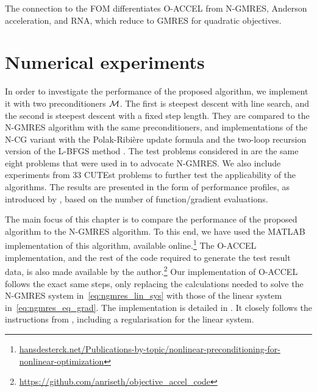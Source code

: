 \documentclass[main.tex]{subfiles}
\begin{document}
\begin{remark}
  The connection to the FOM differentiates O-ACCEL from N-GMRES,
  Anderson acceleration, and RNA, which reduce to GMRES for quadratic
  objectives.
\end{remark}


\section{Numerical experiments}\label{sec:num_experiments}
In order to investigate the performance of the proposed algorithm, we
implement it with two preconditioners $\mathcal{M}$. The first is steepest
descent with line search, and the second is steepest descent with a
fixed step length.  They are compared to the N-GMRES algorithm with
the same preconditioners, and implementations of the N-CG variant with
the Polak-Ribi\`{e}re update formula and the two-loop recursion version of the L-BFGS method
\citep{nocedal2006numerical}.  The test problems considered in
are the same eight problems that were used
in \citet{sterck2013steepest} to advocate N-GMRES. We also include
experiments from \num{33} CUTEst problems to further test the
applicability of the algorithms.  The results are presented in the
form of performance profiles, as introduced by
\citet{dolan2002benchmarking}, based on the number of
function/gradient evaluations.

The main focus of this chapter is to compare the performance of the
proposed algorithm to the N-GMRES algorithm. To this end, we have used
the MATLAB implementation of this algorithm, available
online.\footnote{\href{http://www.hansdesterck.net/Publications-by-topic/nonlinear-preconditioning-for-nonlinear-optimization}
  {hansdesterck.net/Publications-by-topic/nonlinear-preconditioning-for-nonlinear-optimization}}
The O-ACCEL implementation, and the rest of the code required to
generate the test result data, is also made available by the
author.\footnote{\url{https://github.com/anriseth/objective_accel_code}}
Our implementation of O-ACCEL follows the exact same steps, only
replacing the calculations needed to solve the N-GMRES system
in~\eqref{eq:ngmres_lin_sys} with those of the linear system
in~\eqref{eq:ngmres_eq_grad}.  The implementation is detailed in
. It closely follows the instructions from
\citet{washio1997krylov}, including a regularisation for the linear
system.
\end{document}
